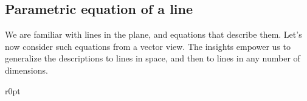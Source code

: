 






\subsection{Parametric equation of a line}
\label{sec:pel}

We are familiar with lines in the plane, and equations that describe them. 
Let's now consider such equations from a vector view.
The insights empower us to generalize the descriptions to lines in space, and then to lines in any number of dimensions.

\begin{wrapfigure}[6]r{0pt} 
\end{wrapfigure}

